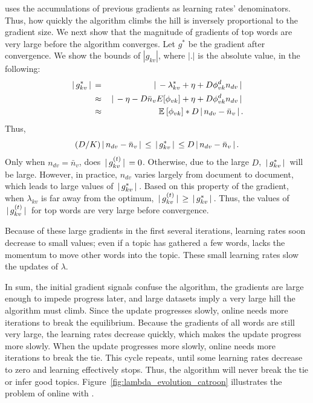  uses the accumulations of previous gradients as learning
rates' denominators. Thus, how quickly the algorithm climbs the hill is inversely proportional to
the gradient size. We next show that the magnitude of gradients of top words are very large before
the algorithm converges. Let $g^*$ be the gradient after convergence. We show
the bounds of $|g_{kv}|$, where $|.|$ is the absolute value, in the following:
\begin{eqnarray*}
	\, | \, g_{kv}^{*} \, | \, &=& \, | \, - \lambda _{kv}^* + \eta  + D\phi _{vk}^d{n_{dv}} \, | \,\\
	&\approx& \, | \, - \eta  - D\bar{n}_vE[{\phi _{vk}}] + \eta  + D\phi _{vk}^d{n_{dv}} \, | \, \\
	&\approx& \mathbb{E}_{}\left[ \phi_{vk} \right]*D \, | \, n_{dv} - \bar{n}_v \, | \,.
\end{eqnarray*}
Thus,
\begin{equation*}
     (D/K) \, | \, n_{dv} - \bar{n}_v \, | \, \le	\, | \, g_{kv}^{*} \, | \,  \le D \, | \, n_{dv} - \bar{n}_v \, | \,.
\end{equation*}
Only when $n_{dv} = \bar{n}_v$, does $\, | \, g_{kv}^{(t)} \, | \, = 0$.
Otherwise, due to the large $D$, $\, | \, g_{kv}^{*} \, | \,$ will be large. However,
in practice, $n_{dv}$ varies largely from document to document, which leads
to large values of $\, | \, g_{kv}^{*} \, | \,$.
Based on this property of the gradient, when $\lambda_{kv}$ is far away from the
optimum, $\, | \, g^{(t)}_{kv} \, | \, \ge \, | \, g^*_{kv} \, | \,$.
Thus, the values of $\, | \, g^{(t)}_{kv} \, | \,$ for top words are very large before
convergence.

Because of these large gradients in the first
several iterations, learning rates soon decrease to small values; even
if a topic has gathered a few words, \adagrad{} lacks the momentum to
move other words into the topic. These small learning rates slow the
updates of $\lambda$.

In sum, the initial gradient signals confuse the algorithm, the
gradients are large enough to impede progress later, and large datasets
imply a very large hill the algorithm must climb.  Since the update
progresses slowly, online  needs more iterations to break the
equilibrium. Because the gradients of all words are still very large,
the learning rates decrease quickly, which makes the update progress
more slowly.
When the update progresses more slowly, online  needs
more iterations to break the tie. This cycle repeats, until some
learning rates decrease to zero and learning effectively stops. Thus, the
algorithm will never break the tie or infer good
topics. Figure~\ref{fig:lambda_evolution_catroon} illustrates the
problem of online  with .

